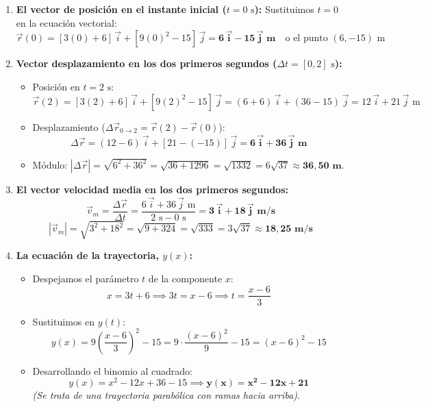 ﻿\documentclass[11pt,a4paper]{article}
\begin{document}
\vspace{0.2cm}
\begin{enumerate}[label=\textbf{\alph*)}, leftmargin=2em, itemsep=8pt]
    \item \textbf{El vector de posición en el instante inicial ($t = 0\text{ s}$):}
    Sustituimos $t = 0$ en la ecuación vectorial:
    \[
    \vec{r}(0) = [3(0) + 6]\,\vec{i} + [9(0)^2 - 15]\,\vec{j} = \mathbf{6\,\vec{i} - 15\,\vec{j}\text{ m}} \quad \text{o el punto } (6, -15)\text{ m}
    \]

    \item \textbf{Vector desplazamiento en los dos primeros segundos ($\Delta t = [0, 2]\text{ s}$):}
    \begin{itemize}[leftmargin=1.5em, itemsep=3pt]
        \item Posición en $t = 2\text{ s}$:
        \[
        \vec{r}(2) = [3(2) + 6]\,\vec{i} + [9(2)^2 - 15]\,\vec{j} = (6 + 6)\,\vec{i} + (36 - 15)\,\vec{j} = 12\,\vec{i} + 21\,\vec{j}\text{ m}
        \]
        \item Desplazamiento ($\Delta\vec{r}_{0\to 2} = \vec{r}(2) - \vec{r}(0)$):
        \[
        \Delta\vec{r} = (12 - 6)\,\vec{i} + [21 - (-15)]\,\vec{j} = \mathbf{6\,\vec{i} + 36\,\vec{j}\text{ m}}
        \]
        \item Módulo: $|\Delta\vec{r}| = \sqrt{6^2 + 36^2} = \sqrt{36 + 1296} = \sqrt{1332} = 6\sqrt{37} \approx \mathbf{36{,}50\text{ m}}$.
    \end{itemize}

    \item \textbf{El vector velocidad media en los dos primeros segundos:}
    \[
    \vec{v}_m = \frac{\Delta\vec{r}}{\Delta t} = \frac{6\,\vec{i} + 36\,\vec{j}\text{ m}}{2\text{ s} - 0\text{ s}} = \mathbf{3\,\vec{i} + 18\,\vec{j}\text{ m/s}}
    \]
    \[
    |\vec{v}_m| = \sqrt{3^2 + 18^2} = \sqrt{9 + 324} = \sqrt{333} = 3\sqrt{37} \approx \mathbf{18{,}25\text{ m/s}}
    \]

    \item \textbf{La ecuación de la trayectoria, $y(x)$:}
    \begin{itemize}[leftmargin=1.5em, itemsep=3pt]
        \item Despejamos el parámetro $t$ de la componente $x$:
        \[
        x = 3t + 6 \implies 3t = x - 6 \implies t = \frac{x - 6}{3}
        \]
        \item Sustituimos en $y(t)$:
        \[
        y(x) = 9\left(\frac{x - 6}{3}\right)^2 - 15 = 9 \cdot \frac{(x - 6)^2}{9} - 15 = (x - 6)^2 - 15
        \]
        \item Desarrollando el binomio al cuadrado:
        \[
        y(x) = x^2 - 12x + 36 - 15 \implies \mathbf{y(x) = x^2 - 12x + 21}
        \]
        \textit{(Se trata de una trayectoria parabólica con ramas hacia arriba)}.
    \end{itemize}


\end{enumerate}
\end{document}
